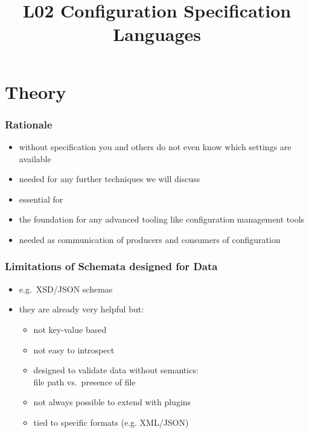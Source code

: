 

\title{L02 Configuration Specification Languages}




\section{Theory}

\begin{frame}
	\frametitle{Rationale}
	\begin{itemize}
	\item without specification you and others do not even know which settings are available
	\item needed for any further techniques we will discuss
	\pause
	\item essential for ~\citet{holland2001nofutz}
	\item the foundation for any advanced tooling like configuration management tools
	\pause
	\item needed as communication of producers and consumers of configuration
	\end{itemize}
\end{frame}

\begin{frame}
	\methodQuestion{}
\end{frame}

\begin{frame}
	\frametitle{Limitations of Schemata designed for Data}
	\begin{itemize}
	\item e.g.\ XSD/JSON schemas
	\item they are already very helpful but:
	\pause
	\begin{itemize}
	\item not key-value based
	\item not easy to introspect
	\item designed to validate data without semantics: \\ file path vs.\ presence of file
	\item not always possible to extend with plugins
	\item tied to specific formats (e.g. XML/JSON)
	\end{itemize}
	\end{itemize}
\end{frame}

